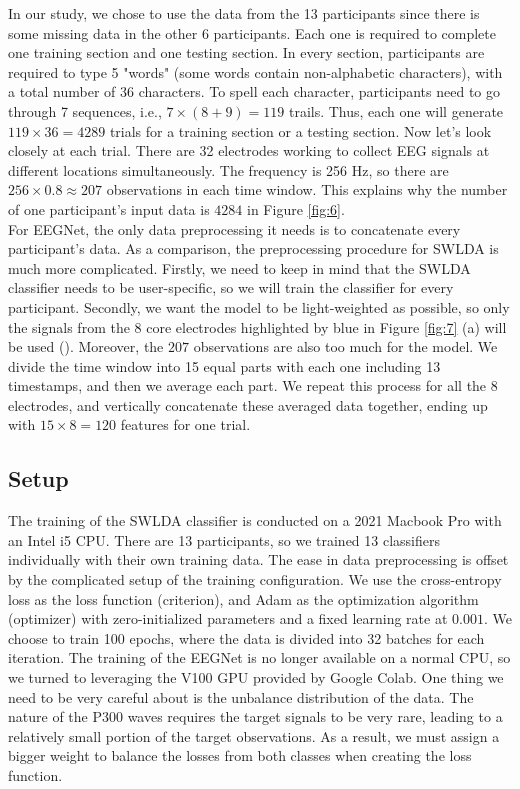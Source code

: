\documentclass{article}
\begin{document}
\vspace{-3mm}
In our study, we chose to use the data from the 13 participants since there is some missing data in the other 6 participants. Each one is required to complete one training section and one testing section. In every section, participants are required to type 5 "words" (some words contain non-alphabetic characters), with a total number of 36 characters. To spell each character, participants need to go through 7 sequences, i.e., $7 \times (8 + 9) = 119$ trails. Thus, each one will generate $119 \times 36 = 4289$ trials for a training section or a testing section. Now let's look closely at each trial. There are 32 electrodes working to collect EEG signals at different locations simultaneously. The frequency is 256 Hz, so there are $256 \times 0.8 \approx 207$ observations in each time window. This explains why the number of one participant's input data is $4284$ in Figure \ref{fig:6}.\\

\vspace{-3mm}
For EEGNet, the only data preprocessing it needs is to concatenate every participant's data. As a comparison, the preprocessing procedure for SWLDA is much more complicated. Firstly, we need to keep in mind that the SWLDA classifier needs to be user-specific, so we will train the classifier for every participant. Secondly, we want the model to be light-weighted as possible, so only the signals from the 8 core electrodes highlighted by blue in Figure \ref{fig:7} (a) will be used (\cite{krusienski2006comparison}). Moreover, the $207$ observations are also too much for the model. We divide the time window into 15 equal parts with each one including 13 timestamps, and then we average each part. We repeat this process for all the 8 electrodes, and vertically concatenate these averaged data together, ending up with $15 \times 8 = 120$ features for one trial.

\subsection{Setup} \label{Setup}
The training of the SWLDA classifier is conducted on a 2021 Macbook Pro with an Intel i5 CPU. There are 13 participants, so we trained 13 classifiers individually with their own training data. The ease in data preprocessing is offset by the complicated setup of the training configuration. We use the cross-entropy loss as the loss function (criterion), and Adam as the optimization algorithm (optimizer) with zero-initialized parameters and a fixed learning rate at $0.001$. We choose to train 100 epochs, where the data is divided into 32 batches for each iteration. The training of the EEGNet is no longer available on a normal CPU, so we turned to leveraging the V100 GPU provided by Google Colab. One thing we need to be very careful about is the unbalance distribution of the data. The nature of the P300 waves requires the target signals to be very rare, leading to a relatively small portion of the target observations. As a result, we must assign a bigger weight to balance the losses from both classes when creating the loss function.\\
\end{document}
